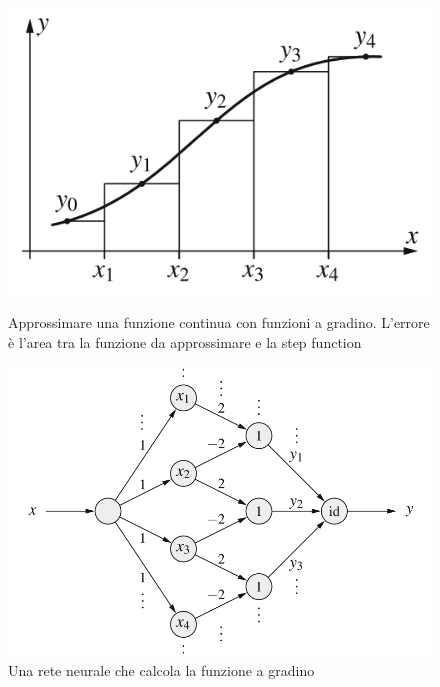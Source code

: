 \begin{figure}[h]
    \centering
    \includegraphics[scale=0.4]{images/step_function.png}
    \caption{Approssimare una funzione continua con funzioni a gradino. L'errore è l'area tra la funzione da approssimare e la step function}
    \includegraphics[scale=0.3]{images/mlp-step-function.png}
    \caption{Una rete neurale che calcola la funzione a gradino}
    \label{fig:enter-label}
\end{figure}

